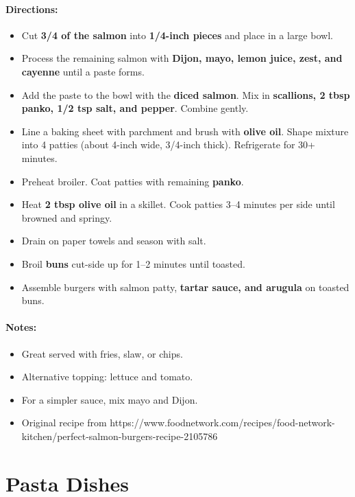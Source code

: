 \documentclass{article}
\begin{document}
\paragraph{Directions:}
\begin{itemize}
    \item Cut \textbf{3/4 of the salmon} into \textbf{1/4-inch pieces} and place in a large bowl.
    \item Process the remaining salmon with \textbf{Dijon, mayo, lemon juice, zest, and cayenne} until a paste forms.
    \item Add the paste to the bowl with the \textbf{diced salmon}. Mix in \textbf{scallions, 2 tbsp panko, 1/2 tsp salt, and pepper}. Combine gently.
    \item Line a baking sheet with parchment and brush with \textbf{olive oil}. Shape mixture into 4 patties (about 4-inch wide, 3/4-inch thick). Refrigerate for 30+ minutes.
    \item Preheat broiler. Coat patties with remaining \textbf{panko}.
    \item Heat \textbf{2 tbsp olive oil} in a skillet. Cook patties 3–4 minutes per side until browned and springy.
    \item Drain on paper towels and season with salt.
    \item Broil \textbf{buns} cut-side up for 1–2 minutes until toasted.
    \item Assemble burgers with salmon patty, \textbf{tartar sauce, and arugula} on toasted buns.
\end{itemize}

\paragraph{Notes:}
\begin{itemize}
    \item Great served with fries, slaw, or chips.
    \item Alternative topping: lettuce and tomato.
    \item For a simpler sauce, mix mayo and Dijon.
    \item Original recipe from https://www.foodnetwork.com/recipes/food-network-kitchen/perfect-salmon-burgers-recipe-2105786
\end{itemize}

\section{Pasta Dishes}
\end{document}
